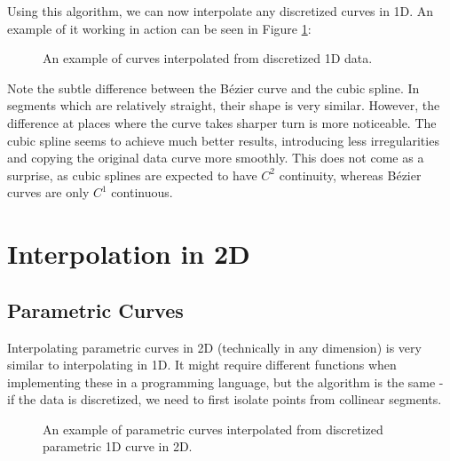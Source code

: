\documentclass[a4paper,10pt]{report}
\begin{document}
Using this algorithm, we can now interpolate any discretized curves in 1D. An example of it working in action can be seen in Figure \ref{fig:1D_fun_interpolated}:
\begin{figure}[H]
    \centering
    \begin{subfigure}{0.6\textwidth}
        
    \end{subfigure}
    \hfill
    \begin{subfigure}{0.39\textwidth}
        
    \end{subfigure}
    \caption{An example of curves interpolated from discretized 1D data.}
    \label{fig:1D_fun_interpolated}
\end{figure}

Note the subtle difference between the Bézier curve and the cubic spline. In segments which are relatively straight, their shape is very similar. However, the difference at places where the curve takes sharper turn is more noticeable. The cubic spline seems to achieve much better results, introducing less irregularities and copying the original data curve more smoothly. This does not come as a surprise, as cubic splines are expected to have \textit{$C^2$} continuity, whereas Bézier curves are only \textit{$C^1$} continuous.

\chapter{Interpolation in 2D}
\section{Parametric Curves}\label{sec:param_curve}
Interpolating parametric curves in 2D (technically in any dimension) is very similar to interpolating in 1D. It might require different functions when implementing these in a programming language, but the algorithm is the same - if the data is discretized, we need to first isolate points from collinear segments.
\begin{figure}[H]
    \centering
    \begin{subfigure}{0.49\textwidth}
        
    \end{subfigure}
    \hfill
    \begin{subfigure}{0.49\textwidth}
        
    \end{subfigure}
    \caption{An example of parametric curves interpolated from discretized parametric 1D curve in 2D.}
    \label{fig:2D_parametric_curve}
\end{figure}
\end{document}
